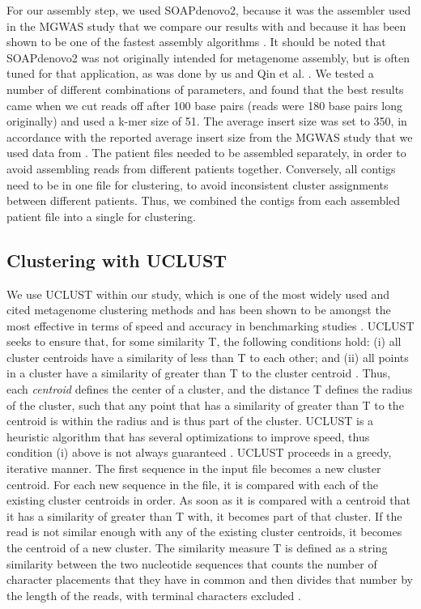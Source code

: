 For our assembly step, we used SOAPdenovo2, because it was the assembler used in the MGWAS study \cite{qin041012} that we compare our results with and because it has been shown to be one of the fastest assembly algorithms \cite{peng12}. It should be noted that SOAPdenovo2 was not originally intended for metagenome assembly, but is often tuned for that application, as was done by us and Qin et al. \cite{qin041012}. We tested a number of different combinations of parameters, and found that the best results came when we cut reads off after 100 base pairs (reads were 180 base pairs long originally) and used a k-mer size of 51. The average insert size was set to 350, in accordance with the reported average insert size from the MGWAS study that we used data from \cite{qin041012}. The patient files needed to be assembled separately, in order to avoid assembling reads from different patients together. Conversely, all contigs need to be in one file for clustering, to avoid inconsistent cluster assignments between different patients. Thus, we combined the contigs from each assembled patient file into a single for clustering.

\subsection{Clustering with UCLUST}

We use UCLUST within our study, which is one of the most widely used and cited metagenome clustering methods and has been shown to be amongst the most effective in terms of speed and accuracy in benchmarking studies \cite{bonder090112, sun042711}. UCLUST seeks to ensure that, for some similarity T, the following conditions hold: (i) all cluster centroids have a similarity of less than T to each other; and (ii) all points in a cluster have a similarity of greater than T to the cluster centroid \cite{Edgar10}. Thus, each \emph{centroid} defines the center of a cluster, and the distance T defines the radius of the cluster, such that any point that has a similarity of greater than T to the centroid is within the radius and is thus part of the cluster. UCLUST is a heuristic algorithm that has several optimizations to improve speed, thus condition (i) above is not always guaranteed \cite{Edgar10}. UCLUST proceeds in a greedy, iterative manner. The first sequence in the input file becomes a new cluster centroid. For each new sequence in the file, it is compared with each of the existing cluster centroids in order. As soon as it is compared with a centroid that it has a similarity of greater than T with, it becomes part of that cluster. If the read is not similar enough with any of the existing cluster centroids, it becomes the centroid of a new cluster. The similarity measure T is defined as a string similarity between the two nucleotide sequences that counts the number of character placements that they have in common and then divides that number by the length of the reads, with terminal characters excluded \cite{Edgar10}. 

